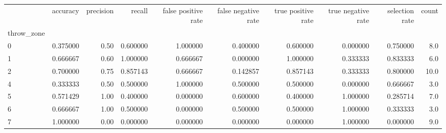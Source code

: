\begin{tabular}{lrrrrrrrrr}
\toprule
{} &  accuracy &  precision &    recall &  false positive rate &  false negative rate &  true positive rate &  true negative rate &  selection rate &  count \\
throw\_zone &           &            &           &                      &                      &                     &                     &                 &        \\
\midrule
0          &  0.375000 &       0.50 &  0.600000 &             1.000000 &             0.400000 &            0.600000 &            0.000000 &        0.750000 &    8.0 \\
1          &  0.666667 &       0.60 &  1.000000 &             0.666667 &             0.000000 &            1.000000 &            0.333333 &        0.833333 &    6.0 \\
2          &  0.700000 &       0.75 &  0.857143 &             0.666667 &             0.142857 &            0.857143 &            0.333333 &        0.800000 &   10.0 \\
4          &  0.333333 &       0.50 &  0.500000 &             1.000000 &             0.500000 &            0.500000 &            0.000000 &        0.666667 &    3.0 \\
5          &  0.571429 &       1.00 &  0.400000 &             0.000000 &             0.600000 &            0.400000 &            1.000000 &        0.285714 &    7.0 \\
6          &  0.666667 &       1.00 &  0.500000 &             0.000000 &             0.500000 &            0.500000 &            1.000000 &        0.333333 &    3.0 \\
7          &  1.000000 &       0.00 &  0.000000 &             0.000000 &             0.000000 &            0.000000 &            1.000000 &        0.000000 &    9.0 \\
\bottomrule
\end{tabular}
